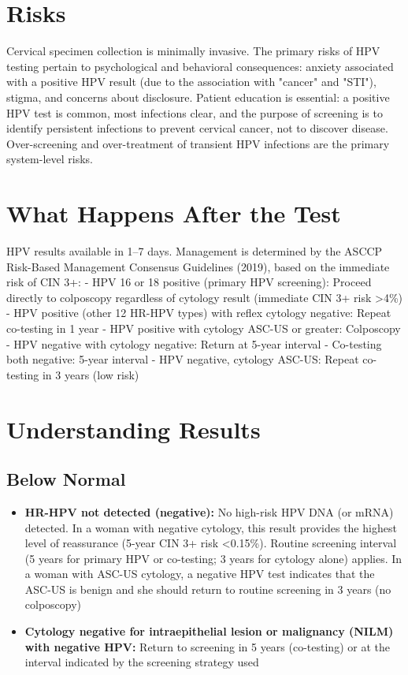 \section*{Risks}
Cervical specimen collection is minimally invasive. The primary risks of HPV testing pertain to psychological and behavioral consequences: anxiety associated with a positive HPV result (due to the association with "cancer" and "STI"), stigma, and concerns about disclosure. Patient education is essential: a positive HPV test is common, most infections clear, and the purpose of screening is to identify persistent infections to prevent cervical cancer, not to discover disease. Over-screening and over-treatment of transient HPV infections are the primary system-level risks.

\section*{What Happens After the Test}
HPV results available in 1--7 days. Management is determined by the ASCCP Risk-Based Management Consensus Guidelines (2019), based on the immediate risk of CIN 3+:
  - HPV 16 or 18 positive (primary HPV screening): Proceed directly to colposcopy regardless of cytology result (immediate CIN 3+ risk >4\%)
  - HPV positive (other 12 HR-HPV types) with reflex cytology negative: Repeat co-testing in 1 year
  - HPV positive with cytology ASC-US or greater: Colposcopy
  - HPV negative with cytology negative: Return at 5-year interval
  - Co-testing both negative: 5-year interval
  - HPV negative, cytology ASC-US: Repeat co-testing in 3 years (low risk)

\section*{Understanding Results}

\subsection*{Below Normal}
\begin{itemize}
  \item \textbf{HR-HPV not detected (negative):} No high-risk HPV DNA (or mRNA) detected. In a woman with negative cytology, this result provides the highest level of reassurance (5-year CIN 3+ risk <0.15\%). Routine screening interval (5 years for primary HPV or co-testing; 3 years for cytology alone) applies. In a woman with ASC-US cytology, a negative HPV test indicates that the ASC-US is benign and she should return to routine screening in 3 years (no colposcopy)
  \item \textbf{Cytology negative for intraepithelial lesion or malignancy (NILM) with negative HPV:} Return to screening in 5 years (co-testing) or at the interval indicated by the screening strategy used
\end{itemize}


